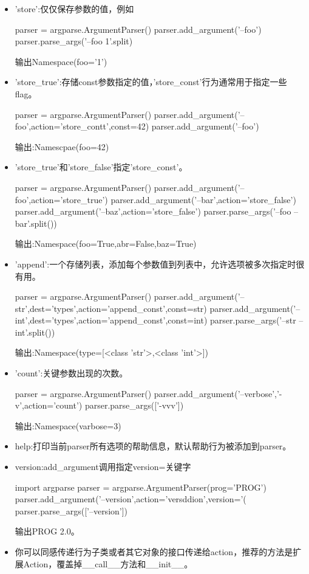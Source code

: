 \begin{itemize}
\item 'store':仅仅保存参数的值，例如
\begin{python}
parser = argparse.ArgumentParser()
parser.add_argument('--foo')
parser.parse_args('--foo 1'.split)
\end{python}
输出Namespace(foo='1')\par
\item 'store\_true':存储const参数指定的值，'store\_const'行为通常用于指定一些flag。
\begin{python}
parser = argparse.ArgumentParser()
parser.add_argument('--foo',action='store_contt',const=42)
parser.add_argument('--foo')
\end{python}
输出:Namescpae(foo=42)
\item 'store\_true'和'store\_false'指定'store\_const'。
\begin{python}
parser = argparse.ArgumentParser()
parser.add_argument('--foo',action='store_true')
parser.add_argument('--bar',action='store_false')
parser.add_argument('--baz',action='store_false')
parser.parse_args('--foo --bar'.split())
\end{python}
输出:Namespace(foo=True,abr=False,baz=True)
\item 'append':一个存储列表，添加每个参数值到列表中，允许选项被多次指定时很有用。
\begin{python}
parser = argparse.ArgumentParser()
parser.add_argument('--str',dest='types',action='append_const',const=str)
parser.add_argument('--int',dest='types',action='append_const',const=int)
parser.parse_args('--str --int'.split())
\end{python}
输出:Namespace(type=[<class 'str'>,<class 'int'>])
\item 'count':关键参数出现的次数。
\begin{python}
parser = argparse.ArgumentParser()
parser.add_argument('--verbose','-v',action='count')
parser.parse_args(['-vvv'])
\end{python}
输出:Namespace(varbose=3)
\item help:打印当前parser所有选项的帮助信息，默认帮助行为被添加到parser。
\item version:add\_argument调用指定version=关键字
\begin{python}
import argparse
parser = argparse.ArgumentParser(prog='PROG')
parser.add_argument('--version',action='versddion',version='(%
parser.parse_args(['--version'])
\end{python}
输出PROG 2.0。
\item 你可以同感传递行为子类或者其它对象的接口传递给action，推荐的方法是扩展Action，覆盖掉\_\_call\_\_方法和\_\_init\_\_。

\end{itemize}
